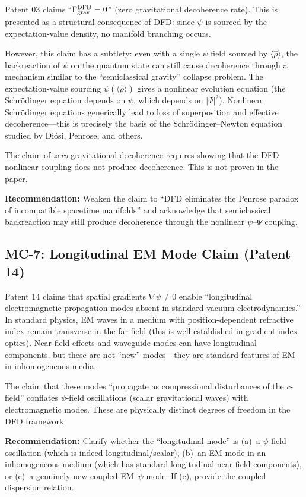 \documentclass[12pt,a4paper]{article}
\begin{document}
\begin{moderate}
Patent 03 claims ``$\Gamma_{\rm grav}^{\rm DFD} = 0$'' (zero gravitational
decoherence rate). This is presented as a structural consequence of DFD:
since $\psi$ is sourced by the expectation-value density, no manifold
branching occurs.

However, this claim has a subtlety: even with a single $\psi$ field
sourced by $\langle\hat{\rho}\rangle$, the backreaction of $\psi$ on the
quantum state can still cause decoherence through a mechanism similar to
the ``semiclassical gravity'' collapse problem. The expectation-value
sourcing $\psi(\langle\hat{\rho}\rangle)$ gives a nonlinear evolution
equation (the Schr\"{o}dinger equation depends on $\psi$, which depends
on $|\Psi|^2$). Nonlinear Schr\"{o}dinger equations generically lead
to loss of superposition and effective decoherence---this is precisely
the basis of the Schr\"{o}dinger--Newton equation studied by
Di\'{o}si, Penrose, and others.

The claim of \textit{zero} gravitational decoherence requires showing
that the DFD nonlinear coupling does not produce decoherence. This is
not proven in the paper.

\textbf{Recommendation:} Weaken the claim to ``DFD eliminates the
Penrose paradox of incompatible spacetime manifolds'' and acknowledge
that semiclassical backreaction may still produce decoherence through
the nonlinear $\psi$--$\Psi$ coupling.
\end{moderate}

\subsection{MC-7: Longitudinal EM Mode Claim (Patent 14)}

\begin{moderate}
Patent 14 claims that spatial gradients $\nabla\psi \neq 0$ enable
``longitudinal electromagnetic propagation modes absent in standard vacuum
electrodynamics.'' In standard physics, EM waves in a medium with
position-dependent refractive index remain transverse in the far field
(this is well-established in gradient-index optics). Near-field effects
and waveguide modes can have longitudinal components, but these are
not ``new'' modes---they are standard features of EM in inhomogeneous media.

The claim that these modes ``propagate as compressional disturbances of
the $c$-field'' conflates $\psi$-field oscillations (scalar gravitational
waves) with electromagnetic modes. These are physically distinct degrees
of freedom in the DFD framework.

\textbf{Recommendation:} Clarify whether the ``longitudinal mode'' is
(a)~a $\psi$-field oscillation (which is indeed longitudinal/scalar),
(b)~an EM mode in an inhomogeneous medium (which has standard longitudinal
near-field components), or (c)~a genuinely new coupled EM--$\psi$ mode.
If (c), provide the coupled dispersion relation.
\end{moderate}
\end{document}
